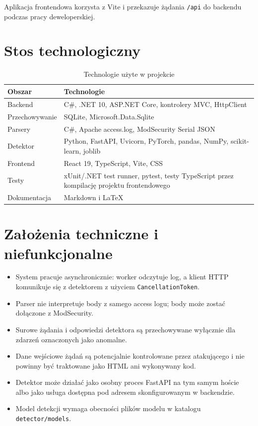 \documentclass[12pt,a4paper]{article}
\newcommand{\code}[1]{\texttt{#1}}
\begin{document}
Aplikacja frontendowa korzysta z Vite i przekazuje żądania \code{/api} do backendu
podczas pracy deweloperskiej.

\section{Stos technologiczny}

\begin{longtable}{p{}p{}}
    \caption{Technologie użyte w projekcie}\label{tab:stack}\\
    \toprule
    \textbf{Obszar} & \textbf{Technologie} \\
    \midrule
    Backend & C\#, .NET 10, ASP.NET Core, kontrolery MVC, HttpClient \\
    Przechowywanie & SQLite, Microsoft.Data.Sqlite \\
    Parsery & C\#, Apache access.log, ModSecurity Serial JSON \\
    Detektor & Python, FastAPI, Uvicorn, PyTorch, pandas, NumPy,
    scikit-learn, joblib \\
    Frontend & React 19, TypeScript, Vite, CSS \\
    Testy & xUnit/.NET test runner, pytest, testy TypeScript przez kompilację
    projektu frontendowego \\
    Dokumentacja & Markdown i LaTeX \\
    \bottomrule
\end{longtable}

\section{Założenia techniczne i niefunkcjonalne}

\begin{itemize}
    \item System pracuje asynchronicznie: worker odczytuje log, a klient HTTP
    komunikuje się z detektorem z użyciem \code{CancellationToken}.
    \item Parser nie interpretuje body z samego access logu; body może zostać
    dołączone z ModSecurity.
    \item Surowe żądania i odpowiedzi detektora są przechowywane wyłącznie dla
    zdarzeń oznaczonych jako anomalne.
    \item Dane wejściowe żądań są potencjalnie kontrolowane przez atakującego i
    nie powinny być traktowane jako HTML ani wykonywany kod.
    \item Detektor może działać jako osobny proces FastAPI na tym samym hoście
    albo jako usługa dostępna pod adresem skonfigurowanym w backendzie.
    \item Model detekcji wymaga obecności plików modelu w katalogu
    \code{detector/models}.
\end{itemize}
\end{document}
